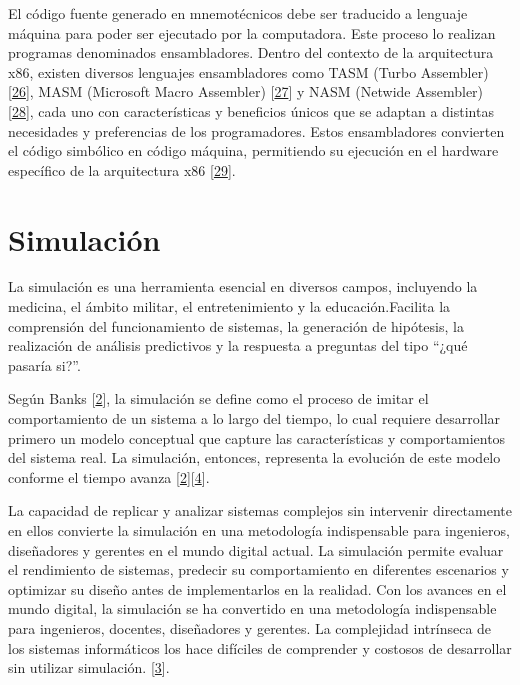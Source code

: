 \documentclass[12pt,twoside]{templates/unerthesis}
\begin{document}
El código fuente generado en mnemotécnicos debe ser traducido a lenguaje máquina para poder ser ejecutado por la computadora. Este proceso lo realizan programas denominados ensambladores. Dentro del contexto de la arquitectura x86, existen diversos lenguajes ensambladores como TASM (Turbo Assembler) {[}\protect\hyperlink{ref-tasm}{26}{]}, MASM (Microsoft Macro Assembler) {[}\protect\hyperlink{ref-masm}{27}{]} y NASM (Netwide Assembler) {[}\protect\hyperlink{ref-nasm}{28}{]}, cada uno con características y beneficios únicos que se adaptan a distintas necesidades y preferencias de los programadores. Estos ensambladores convierten el código simbólico en código máquina, permitiendo su ejecución en el hardware específico de la arquitectura x86 {[}\protect\hyperlink{ref-hyde2010art}{29}{]}.

\hypertarget{simulaciuxf3n}{%
\section{Simulación}\label{simulaciuxf3n}}

La simulación es una herramienta esencial en diversos campos, incluyendo la medicina, el ámbito militar, el entretenimiento y la educación.Facilita la comprensión del funcionamiento de sistemas, la generación de hipótesis, la realización de análisis predictivos y la respuesta a preguntas del tipo ``¿qué pasaría si?''.

Según Banks {[}\protect\hyperlink{ref-banks_discrete-event_2010}{2}{]}, la simulación se define como el proceso de imitar el comportamiento de un sistema a lo largo del tiempo, lo cual requiere desarrollar primero un modelo conceptual que capture las características y comportamientos del sistema real. La simulación, entonces, representa la evolución de este modelo conforme el tiempo avanza {[}\protect\hyperlink{ref-banks_discrete-event_2010}{2}{]}{[}\protect\hyperlink{ref-robinson_simulation_2014}{4}{]}.

La capacidad de replicar y analizar sistemas complejos sin intervenir directamente en ellos convierte la simulación en una metodología indispensable para ingenieros, diseñadores y gerentes en el mundo digital actual. La simulación permite evaluar el rendimiento de sistemas, predecir su comportamiento en diferentes escenarios y optimizar su diseño antes de implementarlos en la realidad. Con los avances en el mundo digital, la simulación se ha convertido en una metodología indispensable para ingenieros, docentes, diseñadores y gerentes. La complejidad intrínseca de los sistemas informáticos los hace difíciles de comprender y costosos de desarrollar sin utilizar simulación. {[}\protect\hyperlink{ref-law_simulation_2015}{3}{]}.
\end{document}
